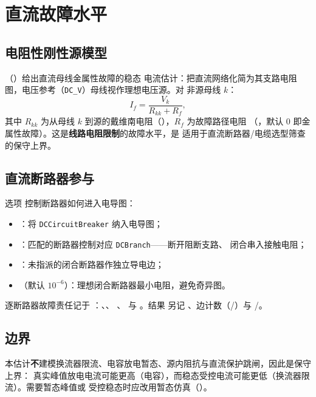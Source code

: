 \section{直流故障水平}\label{sec:sc-dc}

\subsection{电阻性刚性源模型}
（）给出直流母线金属性故障的稳态
电流估计：把直流网络化简为其支路电阻图，电压参考（\texttt{DC\_V}）母线视作理想电压源。对
非源母线 $k$：
\begin{equation}
I_f=\frac{V_k}{R_{kk}+R_f},
\end{equation}
其中 $R_{kk}$ 为从母线 $k$ 到源的戴维南电阻（），$R_f$ 为故障路径电阻
（，默认 0 即金属性故障）。这是\textbf{线路电阻限制}的故障水平，是
适用于直流断路器/电缆选型筛查的保守上界。

\subsection{直流断路器参与}
选项  控制断路器如何进入电导图：
\begin{itemize}
  \item {}：将 \texttt{DCCircuitBreaker} 纳入电导图；
  \item {}：匹配的断路器控制对应 \texttt{DCBranch}——断开阻断支路、
        闭合串入接触电阻；
  \item {}：未指派的闭合断路器作独立导电边；
  \item {}（默认 $10^{-6}$）：理想闭合断路器最小电阻，避免奇异图。
\end{itemize}
逐断路器故障责任记于 ：、、
、 与 。结果  另记
、边计数（/）与
/。

\subsection{边界}
本估计\textbf{不}建模换流器限流、电容放电暂态、源内阻抗与直流保护跳闸，因此是保守上界：
真实峰值放电电流可能更高（电容），而稳态受控电流可能更低（换流器限流）。需要暂态峰值或
受控稳态时应改用暂态仿真（）。
